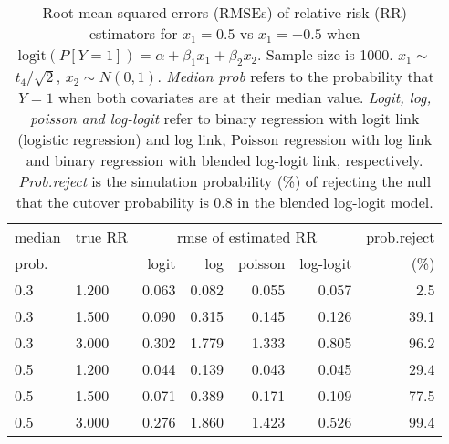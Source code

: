 \documentclass[12pt,a4paper]{article}
\begin{document}
\begin{table}[H] 
\small\sf\centering 
\caption{Root mean squared errors (RMSEs) of relative risk (RR) estimators for $x_1=0.5$ vs $x_1=-0.5$ when $\mbox{logit}(P[Y=1])=\alpha+\beta_1 x_1 + \beta_2 x_2$. Sample size is 1000. $x_1 \sim $$t_4/\sqrt{2}$, $x_2 \sim N(0,1)$. {\it Median prob} refers to the probability that $Y=1$ when both covariates are at their median value. {\it Logit, log, poisson and log-logit} refer to binary regression with logit link (logistic regression) and log link, Poisson regression with log link and binary regression with blended log-logit link, respectively. {\it Prob.reject} is the simulation probability (\%) of rejecting the null that the cutover probability is $0.8$ in the blended log-logit model.} 
\begin{tabular}{llrrrrr} 
\toprule 
median & true RR & \multicolumn{4}{c}{rmse of estimated RR} & prob.reject \\ 
prob. & & logit & log & poisson & log-logit  & (\%) \\ \midrule 
0.3 & 1.200 & 0.063 & 0.082 & 0.055 & 0.057 &  2.5 \\  
0.3 & 1.500 & 0.090 & 0.315 & 0.145 & 0.126 & 39.1 \\  
0.3 & 3.000 & 0.302 & 1.779 & 1.333 & 0.805 & 96.2 \\  
0.5 & 1.200 & 0.044 & 0.139 & 0.043 & 0.045 & 29.4 \\  
0.5 & 1.500 & 0.071 & 0.389 & 0.171 & 0.109 & 77.5 \\  
0.5 & 3.000 & 0.276 & 1.860 & 1.423 & 0.526 & 99.4 \\  
\bottomrule 
\end{tabular} 
\end{table} 
\end{document}
